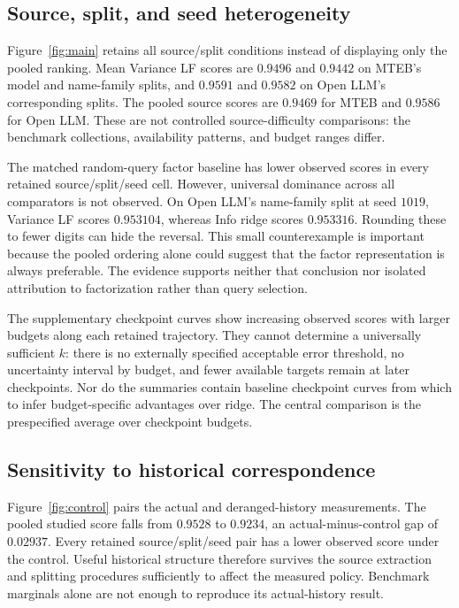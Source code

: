 \documentclass{article}
\begin{document}
\subsection{Source, split, and seed heterogeneity}
Figure~\ref{fig:main} retains all source/split conditions instead of displaying only the pooled ranking. Mean Variance LF scores are $0.9496$ and $0.9442$ on MTEB's model and name-family splits, and $0.9591$ and $0.9582$ on Open LLM's corresponding splits. The pooled source scores are $0.9469$ for MTEB and $0.9586$ for Open LLM. These are not controlled source-difficulty comparisons: the benchmark collections, availability patterns, and budget ranges differ.

The matched random-query factor baseline has lower observed scores in every retained source/split/seed cell. However, universal dominance across all comparators is not observed. On Open LLM's name-family split at seed $1019$, Variance LF scores $0.953104$, whereas Info ridge scores $0.953316$. Rounding these to fewer digits can hide the reversal. This small counterexample is important because the pooled ordering alone could suggest that the factor representation is always preferable. The evidence supports neither that conclusion nor isolated attribution to factorization rather than query selection.

The supplementary checkpoint curves show increasing observed scores with larger budgets along each retained trajectory. They cannot determine a universally sufficient $k$: there is no externally specified acceptable error threshold, no uncertainty interval by budget, and fewer available targets remain at later checkpoints. Nor do the summaries contain baseline checkpoint curves from which to infer budget-specific advantages over ridge. The central comparison is the prespecified average over checkpoint budgets.

\subsection{Sensitivity to historical correspondence}
Figure~\ref{fig:control} pairs the actual and deranged-history measurements. The pooled studied score falls from $0.9528$ to $0.9234$, an actual-minus-control gap of $0.02937$. Every retained source/split/seed pair has a lower observed score under the control. Useful historical structure therefore survives the source extraction and splitting procedures sufficiently to affect the measured policy. Benchmark marginals alone are not enough to reproduce its actual-history result.
\end{document}
